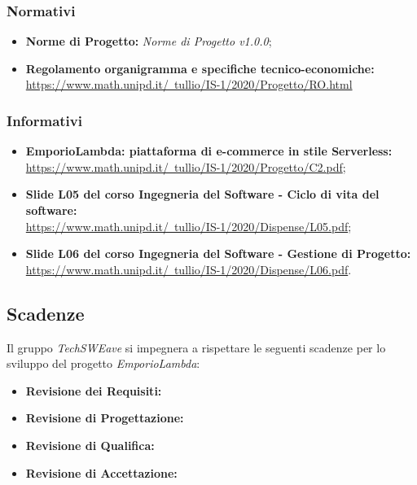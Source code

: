         \subsubsection{Normativi}
        \begin{itemize}
            \item \textbf{Norme di Progetto: } \emph{Norme di Progetto v1.0.0};
            \item \textbf{Regolamento organigramma e specifiche tecnico-economiche: } \\ \href{https://www.math.unipd.it/~tullio/IS-1/2020/Progetto/RO.html}{https://www.math.unipd.it/~tullio/IS-1/2020/Progetto/RO.html}
        \end{itemize}
        \subsubsection{Informativi}
        \begin{itemize}
            \item \textbf{EmporioLambda: piattaforma di e-commerce in stile Serverless: } \\ \href{https://www.math.unipd.it/~tullio/IS-1/2020/Progetto/C2.pdf}{https://www.math.unipd.it/~tullio/IS-1/2020/Progetto/C2.pdf};
            \item \textbf{Slide L05 del corso Ingegneria del Software - Ciclo di vita del software: } \\ \href{https://www.math.unipd.it/~tullio/IS-1/2020/Dispense/L05.pdf}{https://www.math.unipd.it/~tullio/IS-1/2020/Dispense/L05.pdf};
            \item \textbf{Slide L06 del corso Ingegneria del Software - Gestione di Progetto: } \\ \href{https://www.math.unipd.it/~tullio/IS-1/2020/Dispense/L06.pdf}{https://www.math.unipd.it/~tullio/IS-1/2020/Dispense/L06.pdf}.
        \end{itemize}
    \subsection{Scadenze}
    Il gruppo \emph{TechSWEave} si impegnera a rispettare le seguenti scadenze per lo sviluppo del progetto \emph{EmporioLambda}:
    \begin{itemize}
        \item \textbf{Revisione dei Requisiti: }
        \item \textbf{Revisione di Progettazione: }
        \item \textbf{Revisione di Qualifica: }
        \item \textbf{Revisione di Accettazione: }
    \end{itemize}
